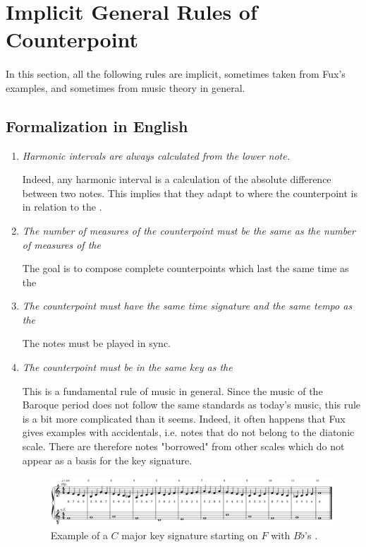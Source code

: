 \section{Implicit General Rules of Counterpoint}

\paragraph{}In this section, all the following rules are implicit, sometimes taken from Fux's examples, and sometimes from music theory in general.

\subsection{Formalization in English} \label{sec:generalenglish}
\begin{enumerate}[wide, label=\bfseries G\arabic*]
    \item \textit{Harmonic intervals are always calculated from the lower note.} \label{rule:hfromlower}

    Indeed, any harmonic interval is a calculation of the absolute difference between two notes. This implies that they adapt to where the counterpoint is in relation to the \cfdot.

    \item \textit{The number of measures of the counterpoint must be the same as the number of measures of the \cfdot} \label{rule:sameNbMeasures}

    The goal is to compose complete counterpoints which last the same time as the \cfdot

    \item \textit{The counterpoint must have the same time signature and the same tempo as the \cfdot} \label{rule:sameTimeSignature}

    The notes must be played in sync.

    \item \textit{The counterpoint must be in the same key as the \cfdot}\label{rule:samekey}

    This is a fundamental rule of music in general. Since the music of the Baroque period does not follow the same standards as today's music, this rule is a bit more complicated than it seems. Indeed, it often happens that Fux gives examples with accidentals, i.e. notes that do not belong to the diatonic scale. There are therefore notes "borrowed" from other scales which do not appear as a basis for the key signature.
    \begin{figure}[h]
        \centering
        \includegraphics[width=\textwidth]{Images/mode_deter_by_first_note.png}
        \caption{Example of a $C$ major key signature starting on $F$ with $B\flat$'s \parencite[p.54]{GaPEng}.}
        \label{fig:mode_determined}
    \end{figure}


\end{enumerate}
